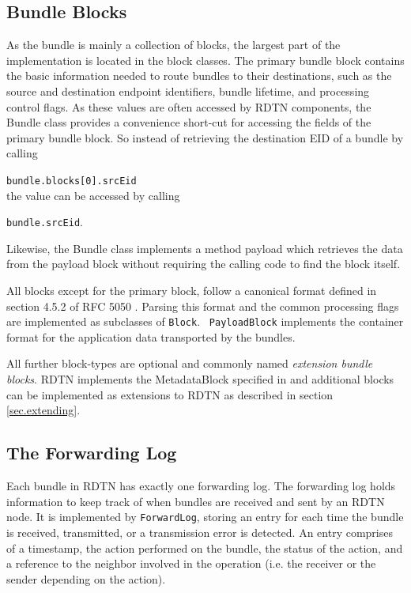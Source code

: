 \documentclass[a4paper]{article}
\begin{document}
\subsection{Bundle Blocks}\label{sec.bundle-blocks}

As the bundle is mainly a collection of blocks, the largest part of the
implementation is located in the block classes. The primary bundle block
contains the basic information needed to route bundles to their destinations,
such as the source and destination endpoint identifiers, bundle lifetime, and
processing control flags. As these values are often accessed by RDTN components,
the Bundle class provides a convenience short-cut for accessing the fields of
the primary bundle block. So instead of retrieving the destination EID of a
bundle by calling

{\tt bundle.blocks[0].srcEid}\\
the value can be accessed by calling

{\tt bundle.srcEid}.

Likewise, the Bundle class implements a method payload which retrieves the data
from the payload block without requiring the calling code to find the block
itself.

All blocks except for the primary block, follow a canonical format defined in
section 4.5.2 of RFC 5050 \cite{bundle-spec}. Parsing this format and the common
processing flags are implemented as subclasses of {\tt Block}.  {\tt
PayloadBlock} implements the container format for the application data
transported by the bundles.

All further block-types are optional and commonly named {\em extension bundle
blocks}. RDTN implements the MetadataBlock specified in \cite{metadata-block}
and additional blocks can be implemented as extensions to RDTN as described in
section \ref{sec.extending}.

\subsection{The Forwarding Log}\label{sec.forward-log}

Each bundle in RDTN has exactly one forwarding log. The forwarding log holds
information to keep track of when bundles are received and sent by an RDTN node.
It is implemented by {\tt ForwardLog}, storing an entry for each time the bundle
is received, transmitted, or a transmission error is detected. An entry
comprises of a timestamp, the action performed on the bundle, the status of the
action, and a reference to the neighbor involved in the operation (i.e. the
receiver or the sender depending on the action).
\end{document}
